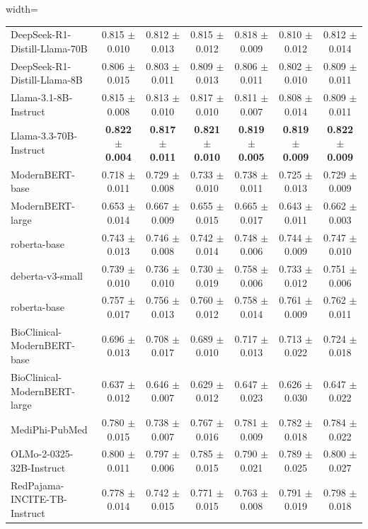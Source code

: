 \documentclass[pdflatex,sn-mathphys-num]{sn-jnl}%
\theoremstyle{thmstyleone}%
\theoremstyle{thmstyletwo}%
\theoremstyle{thmstylethree}%
\begin{document}
\begin{table}[t]
\begin{adjustbox}{width=\textwidth}
\begin{threeparttable}
\begin{tabular}{lcccccc}
DeepSeek-R1-Distill-Llama-70B     & 0.815 $\pm$ 0.010 & 0.812 $\pm$ 0.013 & 0.815 $\pm$ 0.012 & 0.818 $\pm$ 0.009 & 0.810 $\pm$ 0.012 & 0.812 $\pm$ 0.014 \\
DeepSeek-R1-Distill-Llama-8B      & 0.806 $\pm$ 0.015 & 0.803 $\pm$ 0.011 & 0.809 $\pm$ 0.013 & 0.806 $\pm$ 0.011 & 0.802 $\pm$ 0.010 & 0.809 $\pm$ 0.011 \\
Llama-3.1-8B-Instruct             & 0.815 $\pm$ 0.008 & 0.813 $\pm$ 0.010 & 0.817 $\pm$ 0.010 & 0.811 $\pm$ 0.007 & 0.808 $\pm$ 0.014 & 0.809 $\pm$ 0.011 \\
Llama-3.3-70B-Instruct            & \textbf{0.822 $\pm$ 0.004} & \textbf{0.817 $\pm$ 0.011} & \textbf{0.821 $\pm$ 0.010} & \textbf{0.819 $\pm$ 0.005} & \textbf{0.819 $\pm$ 0.009} & \textbf{0.822 $\pm$ 0.009} \\
ModernBERT-base                   & 0.718 $\pm$ 0.011 & 0.729 $\pm$ 0.008 & 0.733 $\pm$ 0.010 & 0.738 $\pm$ 0.011 & 0.725 $\pm$ 0.013 & 0.729 $\pm$ 0.009 \\
ModernBERT-large                  & 0.653 $\pm$ 0.014 & 0.667 $\pm$ 0.009 & 0.655 $\pm$ 0.015 & 0.665 $\pm$ 0.017 & 0.643 $\pm$ 0.011 & 0.662 $\pm$ 0.003 \\
roberta-base                      & 0.743 $\pm$ 0.013 & 0.746 $\pm$ 0.008 & 0.742 $\pm$ 0.014 & 0.748 $\pm$ 0.006 & 0.744 $\pm$ 0.009 & 0.747 $\pm$ 0.010 \\
deberta-v3-small                  & 0.739 $\pm$ 0.010 & 0.736 $\pm$ 0.010 & 0.730 $\pm$ 0.019 & 0.758 $\pm$ 0.006 & 0.733 $\pm$ 0.012 & 0.751 $\pm$ 0.006 \\
roberta-base                      & 0.757 $\pm$ 0.017 & 0.756 $\pm$ 0.013 & 0.760 $\pm$ 0.012 & 0.758 $\pm$ 0.014 & 0.761 $\pm$ 0.009 & 0.762 $\pm$ 0.011 \\
BioClinical-ModernBERT-base       & 0.696 $\pm$ 0.013 & 0.708 $\pm$ 0.017 & 0.689 $\pm$ 0.010 & 0.717 $\pm$ 0.013 & 0.713 $\pm$ 0.022 & 0.724 $\pm$ 0.018 \\
BioClinical-ModernBERT-large      & 0.637 $\pm$ 0.012 & 0.646 $\pm$ 0.007 & 0.629 $\pm$ 0.012 & 0.647 $\pm$ 0.023 & 0.626 $\pm$ 0.030 & 0.647 $\pm$ 0.022 \\
MediPhi-PubMed                    & 0.780 $\pm$ 0.015 & 0.738 $\pm$ 0.007 & 0.767 $\pm$ 0.016 & 0.781 $\pm$ 0.009 & 0.782 $\pm$ 0.018 & 0.784 $\pm$ 0.022 \\
OLMo-2-0325-32B-Instruct          & 0.800 $\pm$ 0.011 & 0.797 $\pm$ 0.006 & 0.785 $\pm$ 0.015 & 0.790 $\pm$ 0.021 & 0.789 $\pm$ 0.025 & 0.800 $\pm$ 0.027 \\
RedPajama-INCITE-TB-Instruct      & 0.778 $\pm$ 0.014 & 0.742 $\pm$ 0.015 & 0.771 $\pm$ 0.015 & 0.763 $\pm$ 0.008 & 0.791 $\pm$ 0.019 & 0.798 $\pm$ 0.018 \\
\bottomrule

\end{tabular}
\end{threeparttable}
\end{adjustbox}
\end{table}
\end{document}
